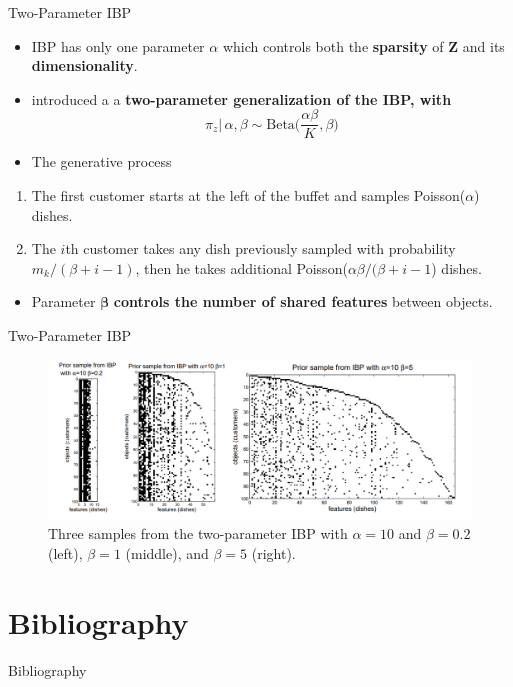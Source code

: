 \documentclass[aspectratio=169,xcolor=dvipsnames]{beamer}
\newcommand{\matz}{\textbf{Z}}
\begin{document}
\begin{frame}{Two-Parameter IBP}
\setlength{\leftmargini}{0.2cm}
\begin{itemize}[<+->]
\item IBP has only one parameter $ \alpha$ which controls both the \textbf{sparsity} of $\matz$ and its \textbf{dimensionality}.
\item \cite{Ghahramani_2007} introduced a a \textbf{two-parameter generalization of the IBP, with}
\begin{equation*}
    \pi_z | \, \alpha, \beta \sim \text{Beta}\Big(\frac{\alpha\beta}{K},\beta\Big)
\end{equation*}
\item The generative process
\end{itemize}
\setlength{\leftmargini}{0.6cm}
\begin{enumerate}[<+->]
\item The first customer starts at the left of the buffet and samples Poisson($\alpha$) dishes. 
\item The $i$th customer takes any dish previously sampled with probability  $m_k/(\beta + i - 1)$, then he takes additional Poisson($\alpha\beta /(\beta +i-1$) dishes.
\end{enumerate}
\setlength{\leftmargini}{0.2cm}
\begin{itemize}[<+->]
\item Parameter $\boldsymbol{\beta}$ \textbf{controls the  number of shared features} between objects.
\end{itemize}
\end{frame}
\begin{frame}{Two-Parameter IBP}
\begin{figure}
    \centering\includegraphics[width=1\columnwidth]{utilities/two_parameters_IBP.png}
    \caption{ Three samples from the two-parameter IBP with $ \alpha = 10$ and $\beta = 0.2$ (left), $\beta = 1$ (middle), and $\beta = 5$ (right).}
    \label{fig:twoP_IBP}
\end{figure}
\end{frame}
\section{Bibliography}
\begin{frame}[allowframebreaks]{Bibliography}

\nocite{gr_gh_IBP_2011}

\end{frame}

\end{document}
